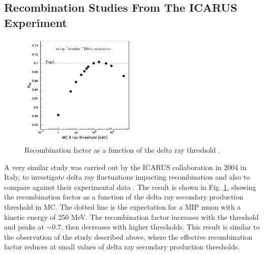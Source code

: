 %

\subsection{Recombination Studies From The ICARUS Experiment}
\label{sec:icarus}

\begin{figure}[bp!]
\centering 
\includegraphics[width=0.5\textwidth]{icarus_recomb}
\caption[Recombination Factor Against Delta Ray Threshold]{
Recombination factor as a function of the delta ray threshold \cite{icarus_recomb}.
}
\label{fig:icarus_recomb}
\end{figure}

A very similar study was carried out by the ICARUS collaboration in 2004 in Italy, to investigate delta ray fluctuations impacting recombination and also to compare against their experimental data \cite{icarus_recomb}. 
The result is shown in Fig. \ref{fig:icarus_recomb}, showing the recombination factor as a function of the delta ray secondary production threshold in MC. 
The dotted line is the expectation for a MIP muon with a kinetic energy of 250 MeV.
The recombination factor increases with the threshold and peaks at $\sim0.7$, then decreases with higher thresholds. 
This result is similar to the observation of the study described above, where the effective recombination factor reduces at small values of delta ray secondary production thresholds.

